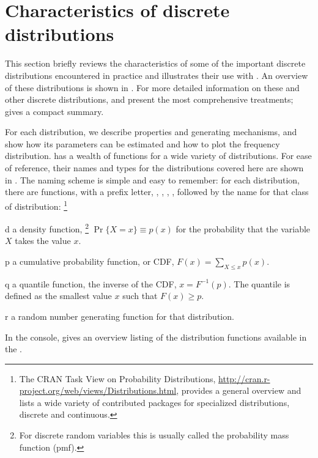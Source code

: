 \documentclass[11pt]{book}
\begin{document}
\section{Characteristics of  discrete distributions}\label{sec:discrete-distrib}
This section briefly reviews the characteristics of some of the
important discrete distributions encountered in practice and illustrates their
use with \R.
An overview of these distributions is shown in .
For more detailed information on these and other discrete distributions,
\citet{Johnson-etal:92} and \citet{WimmerAltman:1999:thesaurus}
present the most comprehensive treatments;
\citet[]{Zelterman:99} gives a compact summary.



For each distribution, we describe properties and generating
mechanisms, and show how its parameters can be estimated
and how to plot the frequency distribution.  \R has a wealth of
functions for a wide variety of distributions.  For ease of reference,
their names and types for the distributions covered here are shown
in . The naming scheme is simple and easy to
remember:  for each distribution, there are functions, with a prefix
letter, , , , , followed by the
name for that class of distribution:%
\footnote{The CRAN Task View on Probability Distributions,
\url{http://cran.r-project.org/web/views/Distributions.html},
provides a general overview and lists a wide variety of contributed
packages for specialized distributions, discrete and continuous.}
\begin{description*}
  \item[d] a density function,%
\footnote{
For discrete random variables this is usually called the probability mass function (pmf).
}
  $\Pr \{X = x\} \equiv p(x)$
for the probability that the variable $X$ takes the value $x$.
  \item[p] a cumulative probability function, or CDF, 
  $F(x) = \sum_{X\le x} p(x)$.
  \item[q] a quantile function, the inverse of the CDF, $x = F^{-1} (p)$. 
  The quantile  is defined as the smallest value $x$ such that $F(x) \ge p$. 
  \item[r] a random number generating function for that distribution.
\end{description*}
In the \R console,  gives an overview listing of
the distribution functions available in the .
\end{document}
